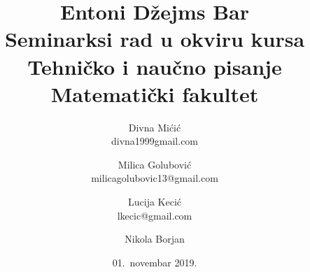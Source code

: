 \documentclass[a4paper]{article}
\begin{document}
	
	\title{Entoni Džejms Bar\\ \small{Seminarksi rad u okviru kursa\\Tehničko i naučno pisanje\\Matematički fakultet}}
	
	\author{Divna Mićić\\ divna1999gmail.com \and
		Milica Golubović \\ milicagolubovic13@gmail.com \and
		Lucija Kecić \\ lkecic@gmail.com \and
		Nikola Borjan \\ } 
	
	\date{01.~novembar 2019.}
	
	\maketitle
	
	
	
\end{document}
